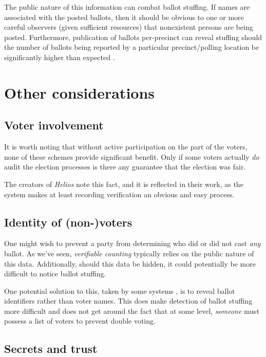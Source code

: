 \documentclass[10pt,twocolumn]{article}
\newcommand{\term}[1]{\textit{#1}}
\begin{document}
The public nature of this information can combat ballot stuffing. If names are associated with
the posted ballots, then it should be obvious to one or more careful observers (given sufficient
resources) that nonexistent persons are being posted. Furthermore, publication of ballots
per-precinct can reveal stuffing should the number of ballots being reported by a particular
precinct/polling location be significantly higher than expected \cite{helios}.

\section{Other considerations}

\subsection{Voter involvement}

It is worth noting that without active participation on the part of the voters, none of these
schemes provide significant benefit. Only if some voters actually \emph{do} audit the election
processes is there any guarantee that the election was fair.

The creators of \term{Helios} note this fact, and it is reflected in their work, as the system makes at
least recording verification an obvious and easy process.

\subsection{Identity of (non-)voters}

One might wish to prevent a party from determining who did or did not cast \emph{any} ballot.
As we've seen, \term{verifiable counting} typically relies on the public nature of this data.
Additionally, should this data be hidden, it could potentially be more difficult to notice ballot
stuffing.

One potential solution to this, taken by some systems \cite{preta}, is to reveal ballot identifiers
rather than voter names. This does make detection of ballot stuffing more difficult and does not get
around the fact that at some level, \emph{someone} must possess a list of voters to prevent double
voting.

\subsection{Secrets and trust}
\end{document}

